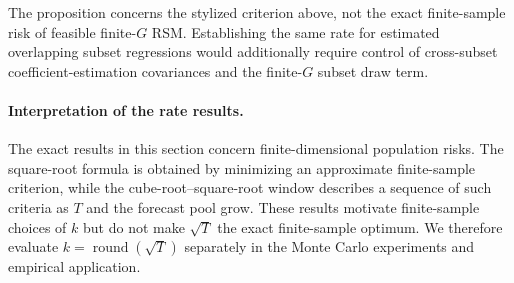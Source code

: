 The proposition concerns the stylized criterion above, not the exact
finite-sample risk of feasible finite-$G$ RSM. Establishing the same rate for
estimated overlapping subset regressions would additionally require control
of cross-subset coefficient-estimation covariances and the finite-$G$ subset
draw term.


\paragraph{Interpretation of the rate results.}
The exact results in this section concern finite-dimensional population
risks. The square-root formula is obtained by minimizing an approximate
finite-sample criterion, while the cube-root--square-root window describes a
sequence of such criteria as $T$ and the forecast pool grow. These results
motivate finite-sample choices of $k$ but do not make $\sqrt T$ the exact
finite-sample optimum. We therefore evaluate $k=\operatorname{round}(\sqrt T)$
separately in the Monte Carlo experiments and empirical application.

